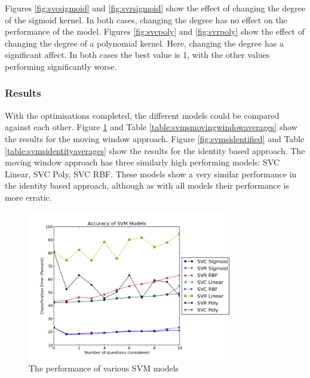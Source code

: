 Figures \ref{fig:svcsigmoid} and \ref{fig:svrsigmoid} show the effect of changing the degree of the sigmoid kernel. In both cases, changing the degree has no effect on the performance of the model. Figures \ref{fig:svcpoly} and \ref{fig:svrpoly} show the effect of changing the degree of a polynomial kernel. Here, changing the degree has a significant affect. In both cases the best value is 1, with the other values performing significantly worse.

\subsubsection{Results}
With the optimisations completed, the different models could be compared against each other. Figure \ref{fig:svmsmovingwindow} and Table \ref{table:svmsmovingwindowaverages} show the results for the moving window approach. Figure \ref{fig:svmsidentified} and Table \ref{table:svmsidentityaverages} show the results for the identity based approach. 
The moving window approach has three similarly high performing models: SVC Linear, SVC Poly, SVC RBF. These models show a very similar performance in the identity based approach, although as with all models their performance is more erratic.

\begin{figure}[h!]
\centering
\includegraphics[width=0.8\textwidth]{images/svmsmovingwindow.png}
\caption{The performance of various SVM models}
\label{fig:svmsmovingwindow}
\end{figure}

